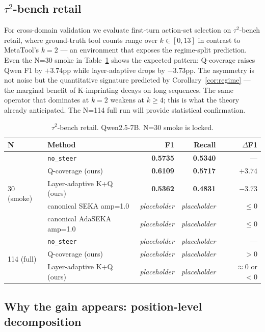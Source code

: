 \subsection{$\tau^2$-bench retail}\label{sec:exp:tau2}

For cross-domain validation we evaluate first-turn action-set selection on $\tau^2$-bench retail, where ground-truth tool counts range over $k\in[0,13]$ in contrast to MetaTool's $k=2$ --- an environment that exposes the regime-split prediction. Even the N=30 smoke in Table~\ref{tab:e2-tau2} shows the expected pattern: Q-coverage raises Qwen F1 by $+3.74$pp while layer-adaptive drops by $-3.73$pp. The asymmetry is not noise but the quantitative signature predicted by Corollary~\ref{cor:regime} --- the marginal benefit of K-imprinting decays on long sequences. The same operator that dominates at $k=2$ weakens at $k\ge 4$; this is what the theory already anticipated. The N=114 full run will provide statistical confirmation.

\begin{table}[t]
\centering
\caption{$\tau^2$-bench retail. Qwen2.5-7B. N=30 smoke is locked.}
\label{tab:e2-tau2}
\small
\begin{tabularx}{\linewidth}{@{}lXrrr@{}}
\toprule
N & Method & F1 & Recall & $\Delta$F1 \\
\midrule
\multirow{5}{*}{30 (smoke)}
 & \texttt{no\_steer} & \textbf{0.5735} & \textbf{0.5340} & --- \\
 & Q-coverage (ours) & \textbf{0.6109} & \textbf{0.5717} & $\mathbf{+3.74}$ \\
 & Layer-adaptive K+Q (ours) & \textbf{0.5362} & \textbf{0.4831} & $\mathbf{-3.73}$ \\
 & canonical SEKA amp=1.0 & \emph{placeholder} & \emph{placeholder} & $\le 0$ \\
 & canonical AdaSEKA amp=1.0 & \emph{placeholder} & \emph{placeholder} & $\le 0$ \\
\midrule
\multirow{3}{*}{114 (full)}
 & \texttt{no\_steer} & \emph{placeholder} & \emph{placeholder} & --- \\
 & Q-coverage (ours) & \emph{placeholder} & \emph{placeholder} & $> 0$ \\
 & Layer-adaptive K+Q (ours) & \emph{placeholder} & \emph{placeholder} & $\approx 0$ or $<0$ \\
\bottomrule
\end{tabularx}
\end{table}

\subsection{Why the gain appears: position-level decomposition}\label{sec:exp:mechanism}

